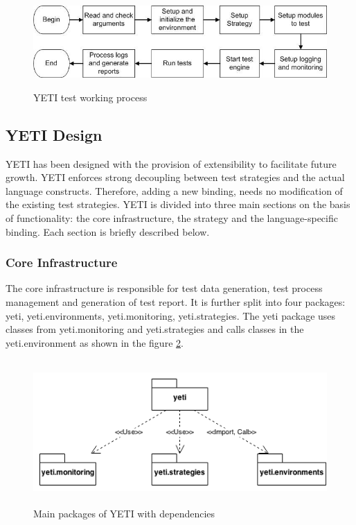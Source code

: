 \begin{figure}[h]
	\centering
	\includegraphics[width=14.5cm, height=3.5cm]{chapter3/yetiOverview.png}
	\caption{YETI test working process}
	\label{fig:yetiOverview}
\end{figure}


\subsection{YETI Design}
YETI has been designed with the provision of extensibility to facilitate future growth. YETI enforces strong decoupling between test strategies and the actual language constructs. Therefore, adding a new binding, needs no modification of the existing test strategies. YETI is divided into three main sections on the basis of functionality: the core infrastructure, the strategy and the language-specific binding. Each section is briefly described below. 

\subsubsection{Core Infrastructure}
The core infrastructure is responsible for test data generation, test process management and generation of test report. It is further split into four packages: yeti, yeti.environments, yeti.monitoring, yeti.strategies. The yeti package uses classes from yeti.monitoring and yeti.strategies and calls classes in the yeti.environment as shown in the figure \ref{fig:yetiCore}. 

\begin{figure}[h]
	\centering
	\includegraphics[width=14.5cm, height=5.5cm]{chapter3/yetiCore.png}
	\caption{Main packages of YETI with dependencies }
	\label{fig:yetiCore}
\end{figure}

